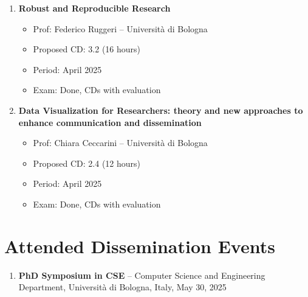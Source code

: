 \documentclass[runningheads]{llncs}
\begin{document}
\begin{enumerate}
        \item \textbf{Robust and Reproducible Research}
        \begin{itemize}
            \item Prof: Federico Ruggeri -- Università di Bologna
            \item Proposed CD: 3.2 (16 hours)
            \item Period: April 2025
            \item Exam: Done, CDs with evaluation
        \end{itemize}
        \item \textbf{Data Visualization for Researchers: theory and new approaches to enhance communication and dissemination}
        \begin{itemize}
            \item Prof: Chiara Ceccarini -- Università di Bologna
            \item Proposed CD: 2.4 (12 hours)
            \item Period: April 2025
            \item Exam: Done, CDs with evaluation
        \end{itemize}

    \end{enumerate}

    \section{Attended Dissemination Events}\label{sec:attended-dissemination-events}
    \begin{enumerate}
        \item \textbf{PhD Symposium in CSE} -- Computer Science and Engineering Department, Università di Bologna, Italy, May 30, 2025
    \end{enumerate}


    
    
\end{document}

